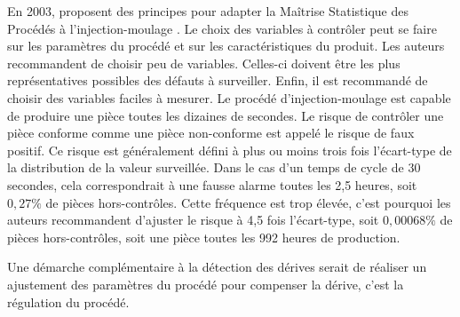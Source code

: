 En 2003, \citeauthor{pillet_maitrise_2003} proposent des principes pour adapter la Maîtrise Statistique des Procédés à l'injection-moulage \cite{pillet_maitrise_2003}.
Le choix des variables à contrôler peut se faire sur les paramètres du procédé et sur les caractéristiques du produit.
Les auteurs recommandent de choisir peu de variables.
Celles-ci doivent être les plus représentatives possibles des défauts à surveiller.
Enfin, il est recommandé de choisir des variables faciles à mesurer.
Le procédé d'injection-moulage est capable de produire une pièce toutes les dizaines de secondes.
Le risque de contrôler une pièce conforme comme une pièce non-conforme est appelé le risque de faux positif.
Ce risque est généralement défini à plus ou moins trois fois l'écart-type de la distribution de la valeur surveillée.
Dans le cas d'un temps de cycle de 30 secondes, cela correspondrait à une fausse alarme toutes les 2,5 heures, soit $0,27\%$ de pièces hors-contrôles.
Cette fréquence est trop élevée, c'est pourquoi les auteurs recommandent d'ajuster le risque à 4,5 fois l'écart-type, soit $0,00068\%$ de pièces hors-contrôles, soit une pièce toutes les 992 heures de production.

Une démarche complémentaire à la détection des dérives serait de réaliser un ajustement des paramètres du procédé pour compenser la dérive, c'est la régulation du procédé.




